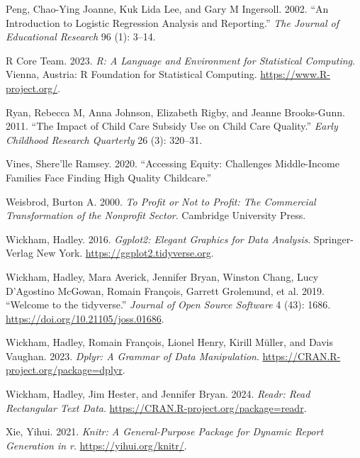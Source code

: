 \documentclass[
  letterpaper,
  DIV=11,
  numbers=noendperiod]{scrartcl}
\newlength{\cslhangindent}
\newenvironment{CSLReferences}[2] %
 {\begin{list}{}{%
  \setlength{\itemindent}{0pt}
  \setlength{\leftmargin}{0pt}
  \setlength{\parsep}{0pt}
  \ifodd #1
   \setlength{\leftmargin}{\cslhangindent}
   \setlength{\itemindent}{-1\cslhangindent}
  \fi
  \setlength{\itemsep}{#2\baselineskip}}}
 {\end{list}}
\begin{document}
\begin{CSLReferences}{1}{0}
Peng, Chao-Ying Joanne, Kuk Lida Lee, and Gary M Ingersoll. 2002. {``An
Introduction to Logistic Regression Analysis and Reporting.''} \emph{The
Journal of Educational Research} 96 (1): 3--14.

R Core Team. 2023. \emph{{R: A Language and Environment for Statistical
Computing}}. Vienna, Austria: R Foundation for Statistical Computing.
\url{https://www.R-project.org/}.

Ryan, Rebecca M, Anna Johnson, Elizabeth Rigby, and Jeanne Brooks-Gunn.
2011. {``The Impact of Child Care Subsidy Use on Child Care Quality.''}
\emph{Early Childhood Research Quarterly} 26 (3): 320--31.

Vines, Shere'lle Ramsey. 2020. {``Accessing Equity: Challenges
Middle-Income Families Face Finding High Quality Childcare.''}

Weisbrod, Burton A. 2000. \emph{To Profit or Not to Profit: The
Commercial Transformation of the Nonprofit Sector}. Cambridge University
Press.

Wickham, Hadley. 2016. \emph{Ggplot2: Elegant Graphics for Data
Analysis}. Springer-Verlag New York.
\url{https://ggplot2.tidyverse.org}.

Wickham, Hadley, Mara Averick, Jennifer Bryan, Winston Chang, Lucy
D'Agostino McGowan, Romain François, Garrett Grolemund, et al. 2019.
{``Welcome to the {tidyverse}.''} \emph{Journal of Open Source Software}
4 (43): 1686. \url{https://doi.org/10.21105/joss.01686}.

Wickham, Hadley, Romain François, Lionel Henry, Kirill Müller, and Davis
Vaughan. 2023. \emph{Dplyr: A Grammar of Data Manipulation}.
\url{https://CRAN.R-project.org/package=dplyr}.

Wickham, Hadley, Jim Hester, and Jennifer Bryan. 2024. \emph{Readr: Read
Rectangular Text Data}. \url{https://CRAN.R-project.org/package=readr}.

Xie, Yihui. 2021. \emph{Knitr: A General-Purpose Package for Dynamic
Report Generation in r}. \url{https://yihui.org/knitr/}.

\end{CSLReferences}
\end{document}
